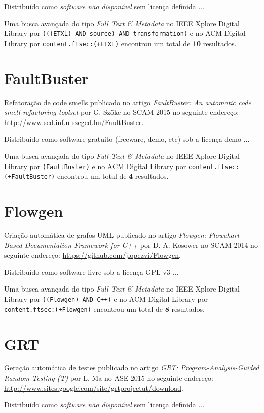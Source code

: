 Distribuído como {\it software não disponível}
sem licença definida ...


Uma busca avançada do tipo {\it Full Text \& Metadata} no IEEE Xplore Digital Library por
\texttt{(((ETXL) AND source) AND transformation)}
e no ACM Digital Library por
\texttt{content.ftsec:(+ETXL)}
encontrou um total de
{\bf 10}
resultados.

\section{FaultBuster}

Refatoração de code smells
publicado no artigo
{\it FaultBuster: An automatic code smell refactoring toolset}
por
G. Szőke
no
SCAM
2015
no seguinte endereço:
\url{http://www.sed.inf.u-szeged.hu/FaultBuster}.

Distribuído como software gratuito (freeware, demo, etc)
sob a licença demo ...


Uma busca avançada do tipo {\it Full Text \& Metadata} no IEEE Xplore Digital Library por
\texttt{(FaultBuster)}
e no ACM Digital Library por
\texttt{content.ftsec:(+FaultBuster)}
encontrou um total de
{\bf 4}
resultados.

\section{Flowgen}

Criação automática de grafos UML
publicado no artigo
{\it Flowgen: Flowchart-Based Documentation Framework for C++}
por
D. A. Kosower
no
SCAM
2014
no seguinte endereço:
\url{https://github.com/jlopezvi/Flowgen}.

Distribuído como software livre
sob a licença GPL v3 ...


Uma busca avançada do tipo {\it Full Text \& Metadata} no IEEE Xplore Digital Library por
\texttt{((Flowgen) AND C++)}
e no ACM Digital Library por
\texttt{content.ftsec:(+Flowgen)}
encontrou um total de
{\bf 8}
resultados.

\section{GRT}

Geração automática de testes
publicado no artigo
{\it GRT: Program-Analysis-Guided Random Testing (T)}
por
L. Ma
no
ASE
2015
no seguinte endereço:
\url{http://www.sites.google.com/site/grtprojectut/download}.

Distribuído como {\it software não disponível}
sem licença definida ...


